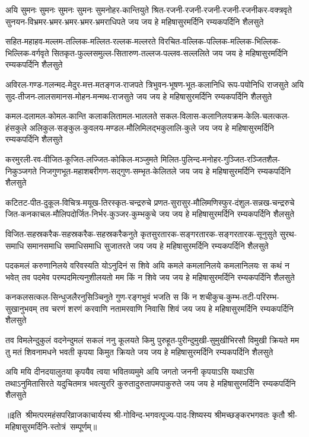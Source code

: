 \fourlineindentedshloka
{अयि सुमनः सुमनः सुमनः सुमनः सुमनोहर-कान्तियुते}
{श्रित-रजनी-रजनी-रजनी-रजनी-रजनीकर-वक्त्रवृते}
{सुनयन-विभ्रमर-भ्रमर-भ्रमर-भ्रमर-भ्रमराधिपते}
{जय जय हे महिषासुरमर्दिनि रम्यकपर्दिनि शैलसुते}

\fourlineindentedshloka
{सहित-महाहव-मल्लम-तल्लिक-मल्लित-रल्लक-मल्लरते}
{विरचित-वल्लिक-पल्लिक-मल्लिक-भिल्लिक-भिल्लिक-वर्गवृते}
{सितकृत-फुल्लसमुल्ल-सितारुण-तल्लज-पल्लव-सल्ललिते}
{जय जय हे महिषासुरमर्दिनि रम्यकपर्दिनि शैलसुते}

\fourlineindentedshloka
{अविरल-गण्ड-गलन्मद-मेदुर-मत्त-मतङ्गज-राजपते}
{त्रिभुवन-भूषण-भूत-कलानिधि रूप-पयोनिधि राजसुते}
{अयि सुद-तीजन-लालसमानस-मोहन-मन्मथ-राजसुते}
{जय जय हे महिषासुरमर्दिनि रम्यकपर्दिनि शैलसुते}

\fourlineindentedshloka
{कमल-दलामल-कोमल-कान्ति कलाकलितामल-भाललते}
{सकल-विलास-कलानिलयक्रम-केलि-चलत्कल-हंसकुले}
{अलिकुल-सङ्कुल-कुवलय-मण्डल-मौलिमिलद्भकुलालि-कुले}
{जय जय हे महिषासुरमर्दिनि रम्यकपर्दिनि शैलसुते}

\fourlineindentedshloka
{करमुरली-रव-वीजित-कूजित-लज्जित-कोकिल-मञ्जुमते}
{मिलित-पुलिन्द-मनोहर-गुञ्जित-रञ्जितशैल-निकुञ्जगते}
{निजगुणभूत-महाशबरीगण-सद्गुण-सम्भृत-केलितले}
{जय जय हे महिषासुरमर्दिनि रम्यकपर्दिनि शैलसुते}

\fourlineindentedshloka
{कटितट-पीत-दुकूल-विचित्र-मयूख-तिरस्कृत-चन्द्ररुचे}
{प्रणत-सुरासुर-मौलिमणिस्फुर-दंशुल-सन्नख-चन्द्ररुचे}
{जित-कनकाचल-मौलिपदोर्जित-निर्भर-कुञ्जर-कुम्भकुचे}
{जय जय हे महिषासुरमर्दिनि रम्यकपर्दिनि शैलसुते}

\fourlineindentedshloka
{विजित-सहस्रकरैक-सहस्रकरैक-सहस्रकरैकनुते}
{कृतसुरतारक-सङ्गरतारक-सङ्गरतारक-सूनुसुते}
{सुरथ-समाधि समानसमाधि समाधिसमाधि सुजातरते}
{जय जय हे महिषासुरमर्दिनि रम्यकपर्दिनि शैलसुते}

\fourlineindentedshloka
{पदकमलं करुणानिलये वरिवस्यति योऽनुदिनं स शिवे}
{अयि कमले कमलानिलये कमलानिलयः स कथं न भवेत्}
{तव पदमेव परम्पदमित्यनुशीलयतो मम किं न शिवे}
{जय जय हे महिषासुरमर्दिनि रम्यकपर्दिनि शैलसुते}

\fourlineindentedshloka
{कनकलसत्कल-सिन्धुजलैरनुसिञ्चिनुते गुण-रङ्गभुवं}
{भजति स किं न शचीकुच-कुम्भ-तटी-परिरम्भ-सुखानुभवम्}
{तव चरणं शरणं करवाणि नतामरवाणि निवासि शिवं}
{जय जय हे महिषासुरमर्दिनि रम्यकपर्दिनि शैलसुते}

\fourlineindentedshloka
{तव विमलेन्दुकुलं वदनेन्दुमलं सकलं ननु कूलयते}
{किमु पुरुहूत-पुरीन्दुमुखी-सुमुखीभिरसौ विमुखी क्रियते}
{मम तु मतं शिवनामधने भवती कृपया किमुत क्रियते}
{जय जय हे महिषासुरमर्दिनि रम्यकपर्दिनि शैलसुते}

\fourlineindentedshloka
{अयि मयि दीनदयालुतया कृपयैव त्वया भवितव्यमुमे}
{अयि जगतो जननी कृपयाऽसि यथाऽसि तथाऽनुमितासिरते}
{यदुचितमत्र भवत्युररि कुरुतादुरुतापमपाकुरुते}
{जय जय हे महिषासुरमर्दिनि रम्यकपर्दिनि शैलसुते}

॥इति~श्रीमत्परमहंसपरिव्राजकाचार्यस्य श्री-गोविन्द-भगवत्पूज्य-पाद-शिष्यस्य
श्रीमच्छङ्करभगवतः कृतौ  श्री-महिषासुरमर्दिनि-स्तोत्रं~सम्पूर्णम्॥